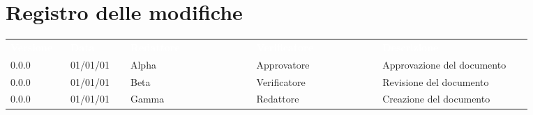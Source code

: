 \section*{Registro delle modifiche}

{\renewcommand{\arraystretch}{1.5}
\begin{tabular}{p{0.10\linewidth}p{0.10\linewidth}p{0.21\linewidth}p{0.21\linewidth}p{0.25\linewidth}}
	\rowcolor[RGB]{33, 73, 50}
	\textcolor{white}{\textbf{Versione}} & \textcolor{white}{\textbf{Data}} & \textcolor{white}
	{\textbf{Redattore}} & \textcolor{white}{\textbf{Verificatore}} & \textcolor{white}
	{\textbf{Descrizione}}\\
	\rowcolor[RGB]{216, 235, 171}
	0.0.0 & 01/01/01 & Alpha & Approvatore & Approvazione del documento\\
	\rowcolor[RGB]{233, 245, 206}
	0.0.0 & 01/01/01 & Beta & Verificatore & Revisione del documento\\
	\rowcolor[RGB]{216, 235, 171}
	0.0.0 & 01/01/01 & Gamma & Redattore & Creazione del documento\\
	
\end{tabular}	
}